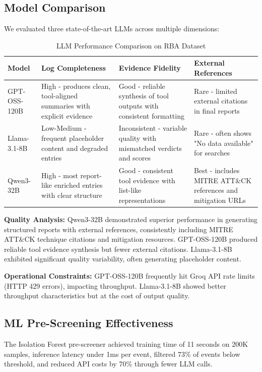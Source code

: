 \documentclass[11pt,twocolumn]{article}
\begin{document}
\subsection{Model Comparison}

We evaluated three state-of-the-art LLMs across multiple dimensions:

\begin{table}[t]
\centering
\caption{LLM Performance Comparison on RBA Dataset}
\begin{tabular}{@{}p{3cm}p{3.5cm}p{3.5cm}p{4cm}@{}}
\toprule
\textbf{Model} & \textbf{Log Completeness} & \textbf{Evidence Fidelity} & \textbf{External References} \\
\midrule
GPT-OSS-120B & High - produces clean, tool-aligned summaries with explicit evidence & Good - reliable synthesis of tool outputs with consistent formatting & Rare - limited external citations in final reports \\
Llama-3.1-8B & Low-Medium - frequent placeholder content and degraded entries & Inconsistent - variable quality with mismatched verdicts and scores & Rare - often shows "No data available" for searches \\
Qwen3-32B & High - most report-like enriched entries with clear structure & Good - consistent tool evidence with list-like representations & Best - includes MITRE ATT\&CK references and mitigation URLs \\
\bottomrule
\end{tabular}
\label{tab:model_comparison}
\end{table}

\textbf{Quality Analysis:} Qwen3-32B demonstrated superior performance in generating structured reports with external references, consistently including MITRE ATT\&CK technique citations and mitigation resources. GPT-OSS-120B produced reliable tool evidence synthesis but fewer external citations. Llama-3.1-8B exhibited significant quality variability, often generating placeholder content.

\textbf{Operational Constraints:} GPT-OSS-120B frequently hit Groq API rate limits (HTTP 429 errors), impacting throughput. Llama-3.1-8B showed better throughput characteristics but at the cost of output quality.

\subsection{ML Pre-Screening Effectiveness}

The Isolation Forest pre-screener achieved training time of 11 seconds on 200K samples, inference latency under 1ms per event, filtered 73\% of events below threshold, and reduced API costs by 70\% through fewer LLM calls.
\end{document}

